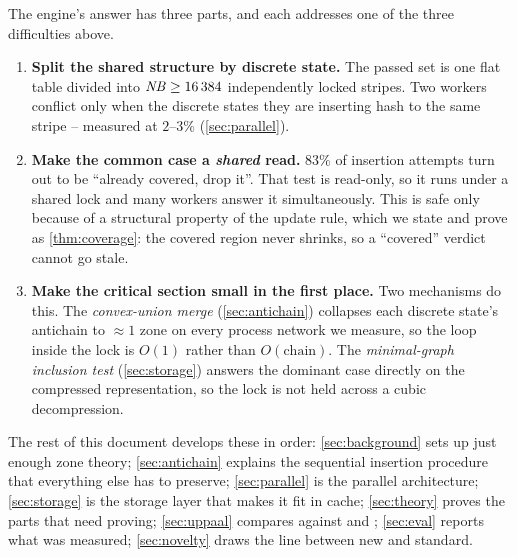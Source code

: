 The engine's answer has three parts, and each addresses one of the three
difficulties above.

\begin{enumerate}[leftmargin=1.5em, itemsep=3pt]
\item \textbf{Split the shared structure by discrete state.}  The passed set is
      one flat table divided into $\mathit{NB} \ge 16\,384$ independently locked
      stripes.  Two workers conflict only when the discrete states they are
      inserting hash to the same stripe -- measured at $2$--$3\%$
      (\cref{sec:parallel}).

\item \textbf{Make the common case a \emph{shared} read.}  $83\%$ of insertion
      attempts turn out to be ``already covered, drop it''.  That test is
      read-only, so it runs under a shared lock and many workers answer it
      simultaneously.  This is safe only because of a structural property of
      the update rule, which we state and prove as \cref{thm:coverage}: the
      covered region never shrinks, so a ``covered'' verdict cannot go stale.

\item \textbf{Make the critical section small in the first place.}  Two
      mechanisms do this.  The \emph{convex-union merge}
      (\cref{sec:antichain}) collapses each discrete state's antichain to
      $\approx 1$ zone on every process network we measure, so the loop inside
      the lock is $O(1)$ rather than $O(\text{chain})$.  The
      \emph{minimal-graph inclusion test} (\cref{sec:storage}) answers the
      dominant case directly on the compressed representation, so the lock is
      not held across a cubic decompression.
\end{enumerate}

The rest of this document develops these in order: \cref{sec:background} sets
up just enough zone theory; \cref{sec:antichain} explains the sequential
insertion procedure that everything else has to preserve;
\cref{sec:parallel} is the parallel architecture; \cref{sec:storage} is the
storage layer that makes it fit in cache; \cref{sec:theory} proves the parts
that need proving; \cref{sec:uppaal} compares against \uppaal{} and \ltsmin{};
\cref{sec:eval} reports what was measured; \cref{sec:novelty} draws the line
between new and standard.
